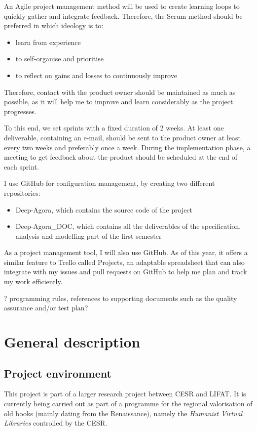 \documentclass{polytech/polytech}
\numberwithin{figure}{chapter}
\begin{document}
An Agile project management method will be used to create learning loops to quickly gather and integrate feedback. Therefore, the Scrum method should be preferred in which ideology is to:
\begin{itemize}
\item learn from experience
\item to self-organise and prioritise
\item to reflect on gains and losses to continuously improve
\end{itemize}

Therefore, contact with the product owner should be maintained as much as possible, as it will help me to improve and learn considerably as the project progresses.

To this end, we set sprints with a fixed duration of 2 weeks.
At least one deliverable, containing an e-mail, should be sent to the product owner at least every two weeks and preferably once a week.
During the implementation phase, a meeting to get feedback about the product should be scheduled at the end of each sprint.

I use GitHub for configuration management, by creating two different repositories:
\begin{itemize}
\item Deep-Agora, which contains the source code of the project
\item Deep-Agora_DOC, which contains all the deliverables of the specification, analysis and modelling part of the first semester
\end{itemize}
As a project management tool, I will also use GitHub. As of this year, it offers a similar feature to Trello called Projects, an adaptable spreadsheet that can also integrate with my issues and pull requests on GitHub to help me plan and track my work efficiently.

? programming rules, references to supporting documents such as the quality assurance and/or test plan?

\chapter{General description}
\section{Project environment}

This project is part of a larger research project between CESR and LIFAT. It is currently being carried out as part of a programme for the regional valorisation of old books (mainly dating from the Renaissance), namely the {\it Humanist Virtual Libraries} controlled by the CESR.
\end{document}
